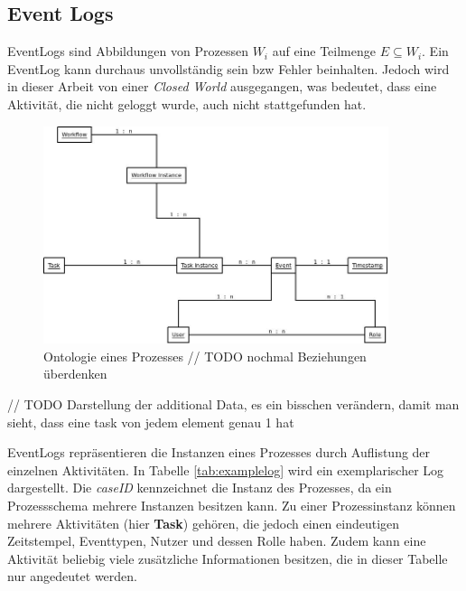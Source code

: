 \subsection{Event Logs}

EventLogs sind Abbildungen von Prozessen $W_i$ auf eine Teilmenge $E \subseteq W_i$. Ein EventLog kann durchaus unvollständig sein bzw Fehler beinhalten. Jedoch wird in dieser Arbeit von einer \textit{Closed World} ausgegangen, was bedeutet, dass eine Aktivität, die nicht geloggt wurde, auch nicht stattgefunden hat.


\begin{figure}[h!]
	\centering
  \includegraphics[width=0.9\textwidth]{Figures/WorkflowOntology}
	\caption{Ontologie eines Prozesses // TODO nochmal Beziehungen überdenken}
	\label{fig:ontology}
\end{figure}

// TODO Darstellung der additional Data, es ein bisschen verändern, damit man sieht, dass eine task von jedem element genau 1 hat

EventLogs repräsentieren die Instanzen eines Prozesses durch Auflistung der einzelnen Aktivitäten. In Tabelle \ref{tab:examplelog} wird ein exemplarischer Log dargestellt. Die \textit{caseID} kennzeichnet die Instanz des Prozesses, da ein Prozessschema mehrere Instanzen besitzen kann. Zu einer Prozessinstanz können mehrere Aktivitäten (hier \textbf{Task}) gehören, die jedoch einen eindeutigen Zeitstempel, Eventtypen, Nutzer und dessen Rolle haben. Zudem kann eine Aktivität beliebig viele zusätzliche Informationen besitzen, die in dieser Tabelle nur angedeutet werden.

